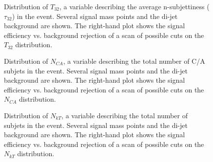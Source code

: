 

\begin{figure}
\centering
{}
\label{fig:search:search:optimization:T32}
\caption{Distribution of $T_{32}$, a variable describing the average n-subjettiness ($\tau_{32}$) in the event. Several signal mass points and the \herwigpp di-jet background are shown. The right-hand plot shows the signal efficiency vs. background rejection of a scan of possible cuts on the $T_{32}$ distribution.}
\end{figure}





\begin{figure}
\centering
{}
\label{fig:search:search:optimization:NCA}
\caption{Distribution of $N_{CA}$, a variable describing the total number of C/A subjets in the event. Several signal mass points and the \herwigpp di-jet background are shown. The right-hand plot shows the signal efficiency vs. background rejection of a scan of possible cuts on the $N_{CA}$ distribution.}
\end{figure}





\begin{figure}
\centering
{}
\label{fig:search:search:optimization:NKT}
\caption{Distribution of $N_{kT}$, a variable describing the total number of \kt subjets in the event. Several signal mass points and the \herwigpp di-jet background are shown. The right-hand plot shows the signal efficiency vs. background rejection of a scan of possible cuts on the $N_{kT}$ distribution.}
\end{figure}

